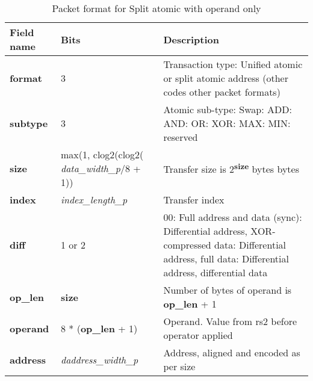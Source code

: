 \begin{table}[htp]
  \centering
  \caption{Packet format for Split atomic with operand only}
  \label{tab:te_datadx0y8}
  \begin{tabulary}{\textwidth}{|l|p{38mm}|p{92mm}|}
    \hline
    {\bf Field name} & {\bf Bits} & {\bf Description} \\
    \hline
    \textbf{format} & 	3	& Transaction type: Unified atomic or split atomic address\newline	
		(other codes other packet formats)\\
    \hline
    \textbf{subtype} & 	3	& Atomic sub-type: Swap: ADD: AND: OR: XOR: MAX: MIN: reserved\\	
    \hline
    \textbf{size} & max(1, clog2(clog2( \textit{data\_width\_p}/8 + 1)) & Transfer size is 2\textsuperscript{\textbf{size}} bytes bytes\\
    \hline
    \textbf{index} & \textit{index\_length\_p} & Transfer index\\
    \hline
    \textbf{diff} & 1 or 2 & 00: Full address and data (sync):  Differential address, XOR-compressed data: Differential address, full data: Differential address, differential data\\
    \hline
    \textbf{op\_len} & \textbf{size} &	Number of bytes of operand is \textbf{op\_len} + 1\\
    \hline
    \textbf{operand}	& 8 * (\textbf{op\_len} + 1) & Operand.  Value from rs2 before operator applied\\
    \hline
    \textbf{address} &  \textit{daddress\_width\_p} &Address, aligned and encoded as per size \\
    \hline
  \end{tabulary}
\end{table}


